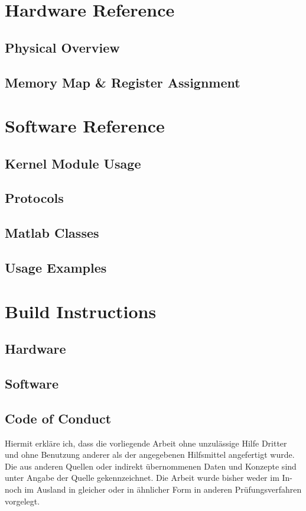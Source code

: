 \documentclass[12pt,a4paper,parskip=full,abstract=true,BCOR=10mm,twoside,open=right]{scrreprt}
\begin{document}
\begin{appendix}
    \chapter{Hardware Reference}
    \section{Physical Overview}
    \section{Memory Map \& Register Assignment}
    \chapter{Software Reference}
    \section{Kernel Module Usage}
    \section{Protocols}
    \section{Matlab Classes}
    \section{Usage Examples}
    \chapter{Build Instructions}
    \section{Hardware}
    \section{Software}

    \printglossary[type=\acronymtype]

    \listoffigures

    
    

\begin{otherlanguage}{ngerman}
    \chapter*{Code of Conduct}
    Hiermit erkl\"are ich, dass die vorliegende Arbeit ohne unzul\"assige Hilfe Dritter und ohne Benutzung
    anderer als der angegebenen Hilfsmittel angefertigt wurde. Die aus anderen Quellen oder indirekt
    \"ubernommenen Daten und Konzepte sind unter Angabe der Quelle gekennzeichnet.
    Die Arbeit wurde bisher weder im In- noch im Ausland in gleicher oder in \"ahnlicher Form in anderen
    Pr\"ufungsverfahren vorgelegt.


\end{otherlanguage}
\end{appendix}
\end{document}
